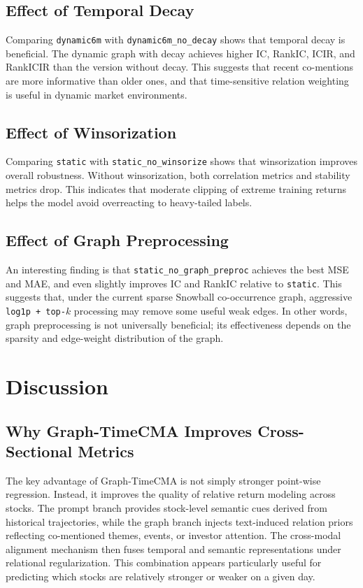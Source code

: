 \documentclass[runningheads]{llncs}
\begin{document}
\subsection{Effect of Temporal Decay}

Comparing \texttt{dynamic6m} with \texttt{dynamic6m\_no\_decay} shows that temporal decay is beneficial. The dynamic graph with decay achieves higher IC, RankIC, ICIR, and RankICIR than the version without decay. This suggests that recent co-mentions are more informative than older ones, and that time-sensitive relation weighting is useful in dynamic market environments.

\subsection{Effect of Winsorization}

Comparing \texttt{static} with \texttt{static\_no\_winsorize} shows that winsorization improves overall robustness. Without winsorization, both correlation metrics and stability metrics drop. This indicates that moderate clipping of extreme training returns helps the model avoid overreacting to heavy-tailed labels.

\subsection{Effect of Graph Preprocessing}

An interesting finding is that \texttt{static\_no\_graph\_preproc} achieves the best MSE and MAE, and even slightly improves IC and RankIC relative to \texttt{static}. This suggests that, under the current sparse Snowball co-occurrence graph, aggressive \texttt{log1p + top-$k$} processing may remove some useful weak edges. In other words, graph preprocessing is not universally beneficial; its effectiveness depends on the sparsity and edge-weight distribution of the graph.

\section{Discussion}

\subsection{Why Graph-TimeCMA Improves Cross-Sectional Metrics}

The key advantage of Graph-TimeCMA is not simply stronger point-wise regression. Instead, it improves the quality of relative return modeling across stocks. The prompt branch provides stock-level semantic cues derived from historical trajectories, while the graph branch injects text-induced relation priors reflecting co-mentioned themes, events, or investor attention. The cross-modal alignment mechanism then fuses temporal and semantic representations under relational regularization. This combination appears particularly useful for predicting which stocks are relatively stronger or weaker on a given day.
\end{document}
